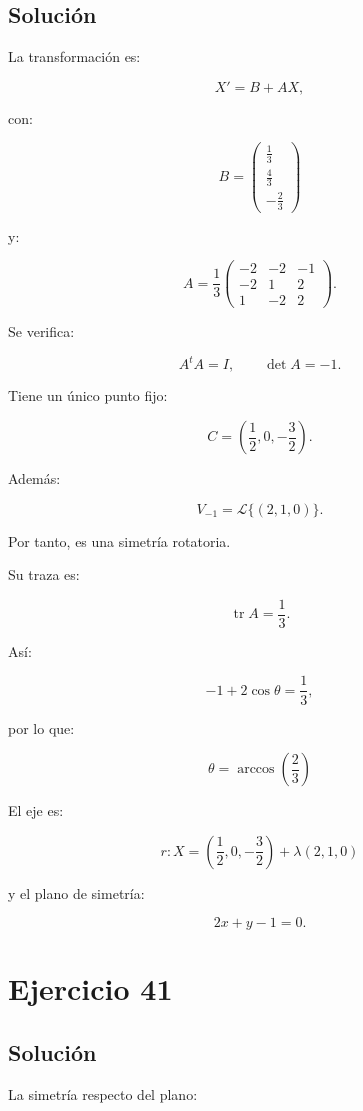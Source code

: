 \documentclass[11pt,a4paper]{article}
\newcommand{\tr}{\operatorname{tr}}
\begin{document}
\subsection{Solución}

La transformación es:

\[
X'=B+AX,
\]

con:

\[
B=
\begin{pmatrix}
\frac13\\[1mm]
\frac43\\[1mm]
-\frac23
\end{pmatrix}
\]

y:

\[
A=
\frac13
\begin{pmatrix}
-2&-2&-1\\
-2&1&2\\
1&-2&2
\end{pmatrix}.
\]

Se verifica:

\[
A^tA=I,
\qquad
\det A=-1.
\]

Tiene un único punto fijo:

\[
\boxed{
C=
\left(
\frac12,0,-\frac32
\right).
}
\]

Además:

\[
V_{-1}
=
\mathcal L\{(2,1,0)\}.
\]

Por tanto, es una simetría rotatoria.

Su traza es:

\[
\tr A=\frac13.
\]

Así:

\[
-1+2\cos\theta=\frac13,
\]

por lo que:

\[
\boxed{
\theta
=
\arccos\left(\frac23\right)
}
\]

El eje es:

\[
\boxed{
r:
X=
\left(
\frac12,0,-\frac32
\right)
+
\lambda(2,1,0)
}
\]

y el plano de simetría:

\[
\boxed{
2x+y-1=0.
}
\]

\section{Ejercicio 41}
\subsection{Solución}

La simetría respecto del plano:
\end{document}
